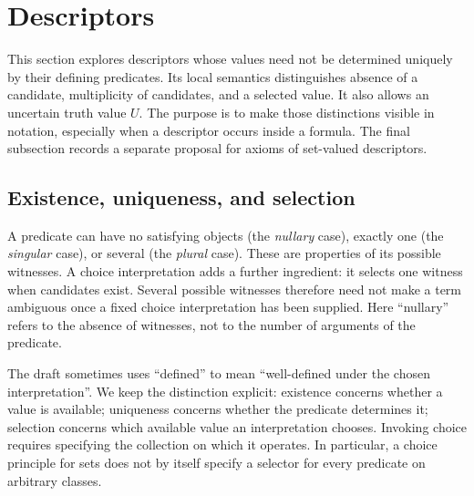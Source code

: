 \def\topic{Descriptors}

\section{Descriptors}
\label{sec:descriptors}

This section explores descriptors whose values need not be determined
uniquely by their defining predicates. Its local semantics distinguishes
absence of a candidate, multiplicity of candidates, and a selected value.
It also allows an uncertain truth value $U$. The purpose is to make those
distinctions visible in notation, especially when a descriptor occurs inside
a formula. The final subsection records a separate proposal for axioms of
set-valued descriptors.

\subsection{Existence, uniqueness, and selection}
A predicate can have no satisfying objects (the \emph{nullary} case), exactly
one (the \emph{singular} case), or several (the \emph{plural} case). These
are properties of its possible witnesses. A choice interpretation adds a
further ingredient: it selects one witness when candidates exist. Several
possible witnesses therefore need not make a term ambiguous once a fixed
choice interpretation has been supplied.
Here ``nullary'' refers to the absence of witnesses, not to the number
of arguments of the predicate.

The draft sometimes uses ``defined'' to mean ``well-defined under the chosen
interpretation''. We keep the distinction explicit:
existence concerns whether a value is available; uniqueness concerns whether
the predicate determines it; selection concerns which available value an
interpretation chooses. Invoking choice requires specifying the collection
on which it operates. In particular, a choice principle for sets does not by
itself specify a selector for every predicate on arbitrary classes.

